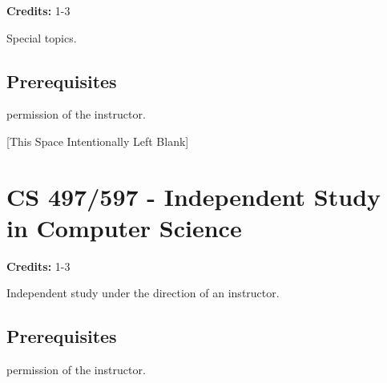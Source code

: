 \documentclass[]{article}
\newcommand{\pagebreakhere}{
\vspace*{\fill}
\begin{center}
[This Space Intentionally Left Blank]
\end{center}
\vspace*{\fill}
\newpage
}
\begin{document}
\textbf{Credits:} 1-3

Special topics.

\subsection{Prerequisites}\label{prerequisites-52}

permission of the instructor.

\pagebreakhere
\section{CS 497/597 - Independent Study in Computer
Science}\label{cs-497597---independent-study-in-computer-science}

\textbf{Credits:} 1-3

Independent study under the direction of an instructor.

\subsection{Prerequisites}\label{prerequisites-53}

permission of the instructor.
\end{document}
